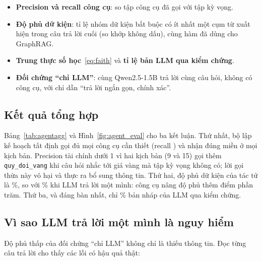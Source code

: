 \begin{itemize}
  \item \textbf{Precision và recall công cụ}: so tập công cụ đã gọi với tập kỳ vọng.
  \item \textbf{Độ phủ dữ kiện}: tỉ lệ nhóm dữ kiện bắt buộc có ít nhất một cụm từ xuất hiện trong câu trả lời cuối
        (so khớp không dấu), cùng hàm đã dùng cho GraphRAG.
  \item \textbf{Trung thực số học}~\eqref{eq:faith} và \textbf{tỉ lệ bản LLM qua kiểm chứng}.
  \item \textbf{Đối chứng ``chỉ LLM''}: cùng Qwen2.5-1.5B trả lời cùng câu hỏi, không có công cụ, với chỉ dẫn ``trả
        lời ngắn gọn, chính xác''.
\end{itemize}

\subsection{Kết quả tổng hợp}


Bảng~\ref{tab:agentagg} và Hình~\ref{fig:agent_eval} cho ba kết luận. Thứ nhất, bộ lập kế hoạch tất định gọi đủ mọi
công cụ cần thiết (recall ) và nhận đúng miền ở mọi kịch bản. Precision tài chính dưới
1 vì hai kịch bản (9 và 15) gọi thêm \texttt{quy\_doi\_vang} khi câu hỏi nhắc tới giá vàng mà tập kỳ vọng không có; lời gọi
thừa này vô hại và thực ra bổ sung thông tin. Thứ hai, độ phủ dữ kiện của tác tử là \%,
so với \% khi LLM trả lời một mình: công cụ nâng độ phủ thêm
 điểm phần trăm. Thứ ba, và đáng bàn nhất, chỉ \% bản nháp
của LLM qua kiểm chứng.


\subsection{Vì sao LLM trả lời một mình là nguy hiểm}
Độ phủ thấp của đối chứng ``chỉ LLM'' không chỉ là thiếu thông tin. Đọc từng câu trả lời cho thấy các lỗi có hậu quả
thật:

